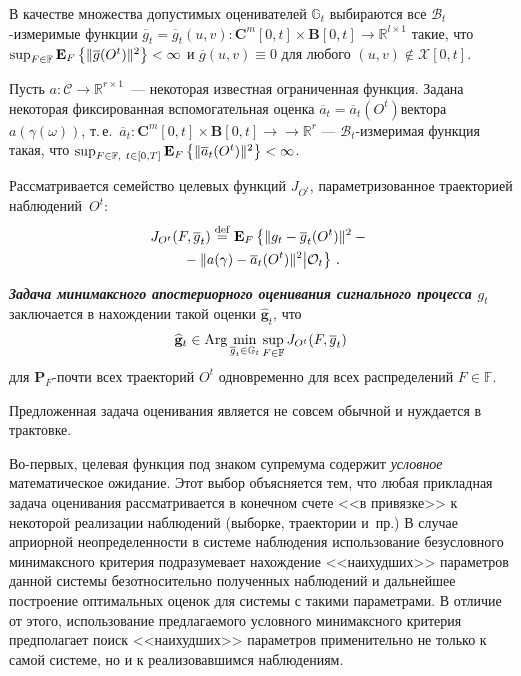 \begin{multicols}{2}
В качестве множества допустимых оценивателей $\mathbb{G}_t$
выбираются все $\mathcal{B}_t$-измеримые функции
$\overline{g}_t=\overline{g}_t(u,v): \mathbf{C}^m[0,t] \times
\mathbf{B}[0,t] \to \mathbb{R}^{l \times 1}$ такие, что 
$\sup_{F \in \mathbb{F}}\mathbf{E}_{ F }\left\{ \mathop{\|\overline{g}(O^t)\|^2} \right\} < \infty$ и
$\overline{g}(u,v) \equiv 0$ для любого $(u,v) \notin
\mathcal{X}[0,t]$.

 Пусть $a: \mathcal{C} \to \mathbb{R}^{r \times 1}$~--- некоторая известная ограниченная
 функция. Задана некоторая фик\-си\-рованная вспомогательная оценка
 $\overline{a}_t=\overline{a}_t(O^t)$\linebreak вектора
 $a(\gamma(\omega))$, т.\,е.\
 $\overline{a}_t: \mathbf{C}^m[0,t] \times
\mathbf{B}[0,t] \to$\linebreak $\to \mathbb{R}^r$ --- $\mathcal{B}_t$-из\-ме\-ри\-мая
функция такая, что $\sup_{F \in \mathbb{F},\ t \in [0,T]}\mathbf{E}_{ F }\left\{ \mathop{\|\overline{a}_t(O^t)\|^2} \right\} < \infty$.

Рассматривается семейство целевых функций $J_{O^t}$,
 параметризованное траекторией наблюдений~$O^t$:
 \begin{multline*}
 J_{O^t}(F,\overline{g}_t)\stackrel{\mathrm {def}}{=} \mathbf{E}_F \left\{ \| g_t-\overline{g}_t(O^t)\|^2-{}\right.\\
\left.{}- \| a(\gamma)-\overline{a}_t(O^t)\|^2\big\vert \mathcal{O}_t \right \}\,.
 \label{eq:loss}
 \end{multline*}

 {\bfseries\textit{Задача минимаксного апостериорного оценивания сигнального
 процесса $g_t$}} заключается в нахождении такой оценки
 $\widehat{\mathbf{g}}_t$, что
\begin{equation}
 \widehat{\mathbf{g}}_t \in \mathop{\mathrm {Arg}} \min_{\overline{g}_t \in
 \mathbb{G}_t} \sup_{F \in \mathbb{F}}J_{O^t}(F,\overline{g}_t)
 \label{eq:problem}
\end{equation}
 для $\mathbf{P}_F$-почти всех траекторий $O^t$ одновременно для
 всех распределений $F \in \mathbb{F}$.

Предложенная задача оценивания является не совсем обычной и
нуждается в трактовке.

Во-первых, целевая функция под знаком супремума содержит
\emph{условное} математическое ожидание. Этот выбор объясняется тем,
что любая прикладная задача оценивания рассматривается в конечном
счете <<в привязке>> к некоторой реализации наблюдений
(выборке, траектории и~пр.) В случае априорной неопределенности в
системе наблюдения использование безусловного минимаксного критерия
подразумевает нахождение <<наихудших>> параметров данной
системы безотносительно полученных наблюдений и дальнейшее
построение оптимальных оценок для системы с такими параметрами. В
отличие от этого, использование предлагаемого условного минимаксного
критерия предполагает поиск <<наихудших>> параметров
применительно не только к самой системе, но и к реализовавшимся
наблюдениям.


\end{multicols}
